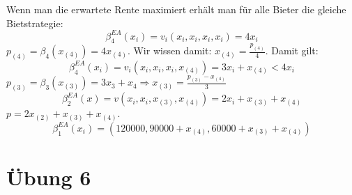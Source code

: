 \documentclass[12pt]{extreport} %
\theoremstyle{named}
\theoremstyle{itshape}
\theoremstyle{normal}
\begin{document}
Wenn man die erwartete Rente maximiert erhält man für alle Bieter die gleiche Bietstrategie:
$$ \beta_{4}^{EA}(x_{i}) = v_{i}(x_{i}, x_{i}, x_{i}, x_{i}) = 4 x_{i} $$
$p_{(4)} = \beta_{4}(x_{(4)}) = 4 x_{(4)}$. Wir wissen damit: $x_{(4)} = \frac{p_{(4)}}{4}$. Damit gilt:
$$  \beta_{4}^{EA}(x_{i}) = v_{i}(x_{i}, x_{i}, x_{i}, x_{(4)}) = 3 x_{i} + x_{(4)} < 4 x_{i}  $$
$p_{(3)} = \beta_{3}(x_{(3)}) = 3x_{3} + x_{4} \Rightarrow x_{(3)} = \frac{p_{(3)} - x_{(4)}}{3}$
$$ \beta_{2}^{EA}(x) = v(x_{i}, x_{i}, x_{(3)}, x_{(4)}) = 2x_{i} + x_{(3)} + x_{(4)} $$
$p = 2x_{(2)} + x_{(3)} + x_{(4)}$.
$$ \beta_{1}^{EA}(x_{i}) =\left( 120000, 90000 + x_{(4)}, 60000 + x_{(3)} + x_{(4)} \right) $$

\section*{Übung 6}
\end{document}
